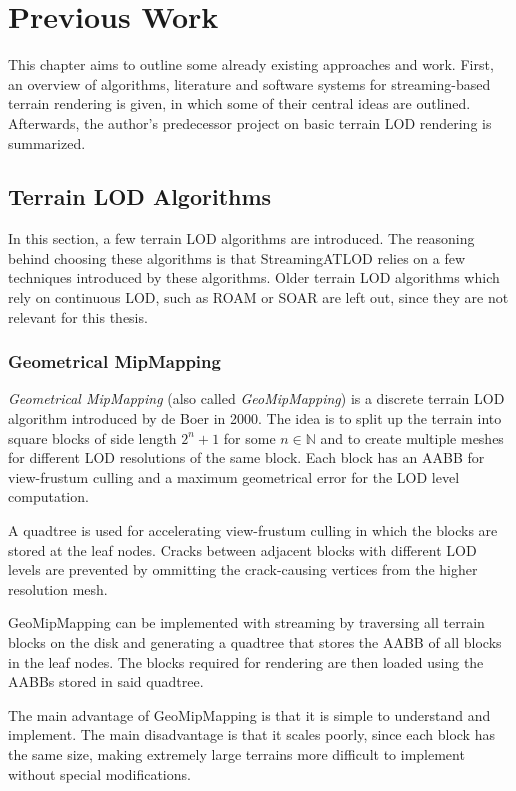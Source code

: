 \chapter{Previous Work}
This chapter aims to outline some already existing approaches and 
work. 
First, an overview of algorithms, literature and software systems for streaming-based terrain rendering is given,
in which some of their central ideas are outlined.
Afterwards, the author's 
predecessor project on basic terrain LOD rendering is summarized.

\section{Terrain LOD Algorithms}
In this section, a few terrain LOD algorithms are introduced. 
The reasoning behind choosing these algorithms is that 
StreamingATLOD relies on a few techniques introduced by these 
algorithms.
Older terrain LOD algorithms which rely on continuous LOD,
such as ROAM \cite{roam} or SOAR \cite{soar} are left out,
since they are not relevant for this thesis.

\subsection{Geometrical MipMapping}
\textit{Geometrical MipMapping} (also called \textit{GeoMipMapping}) is a discrete terrain LOD algorithm 
introduced by de Boer \cite{geomipmapping} in 2000. The idea is 
to split up the terrain into square blocks of side length
$2^n + 1$ for some $n \in \mathbb{N}$ and to create 
multiple meshes for different LOD resolutions of the same block. Each block 
has an AABB for view-frustum culling and a 
maximum geometrical error for the LOD level computation.

A quadtree is used for accelerating view-frustum culling 
in which the blocks are stored at the leaf nodes.
Cracks between adjacent blocks with different LOD levels 
are prevented by ommitting the crack-causing vertices 
from the higher resolution mesh.

GeoMipMapping can be implemented with streaming by traversing 
all terrain blocks on the disk and generating a quadtree that stores 
the AABB of all blocks in the leaf nodes. The blocks required for rendering 
are then loaded using the AABBs stored in said quadtree.

The main advantage of GeoMipMapping is that it is simple to understand 
and implement. The main disadvantage is that it scales poorly, 
since each block has the same size, making extremely large 
terrains more difficult to implement without special modifications.


